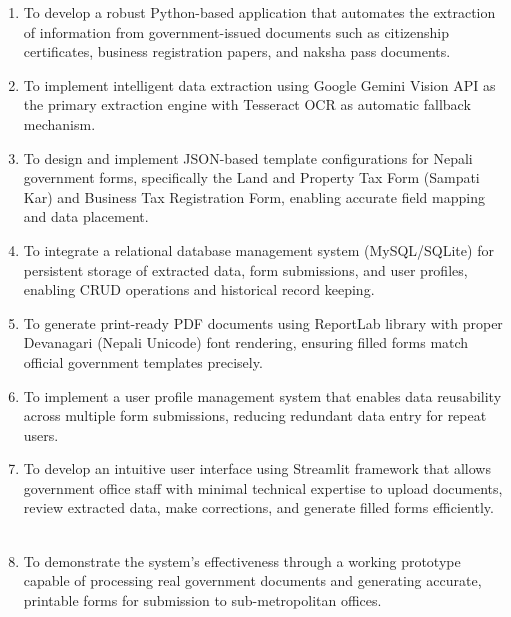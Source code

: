 \documentclass[12pt]{report}
\begin{document}
\begin{enumerate}[label=\textbullet, leftmargin=*, nosep, itemsep=3pt, topsep=2pt]

 \item{To develop a robust Python-based application that automates the 
   extraction of information from government-issued documents such as citizenship 
   certificates, business registration papers, and naksha pass documents.} \
  
 \item {To implement intelligent data extraction using Google Gemini Vision 
   API as the primary extraction engine with Tesseract OCR as automatic fallback 
   mechanism.} \
   
 \item{To design and implement JSON-based template configurations for 
   Nepali government forms, specifically the Land and Property Tax Form (Sampati Kar) 
   and Business Tax Registration Form, enabling accurate field mapping and data 
   placement.} \
   
 \item{To integrate a relational database management system (MySQL/SQLite) 
   for persistent storage of extracted data, form submissions, and user profiles, 
   enabling CRUD operations and historical record keeping.} \
   
 \item{To generate print-ready PDF documents using ReportLab library with 
   proper Devanagari (Nepali Unicode) font rendering, ensuring filled forms match 
   official government templates precisely.} \
   
 \item{To implement a user profile management system that enables data 
   reusability across multiple form submissions, reducing redundant data entry for 
   repeat users.} \
   

 \item{To develop an intuitive user interface using Streamlit framework 
   that allows government office staff with minimal technical expertise to upload 
   documents, review extracted data, make corrections, and generate filled forms 
   efficiently.} \
   

 \item{To demonstrate the system's effectiveness through a working prototype 
   capable of processing real government documents and generating accurate, printable 
   forms for submission to sub-metropolitan offices.} \
   
\end{enumerate}
\end{document}
